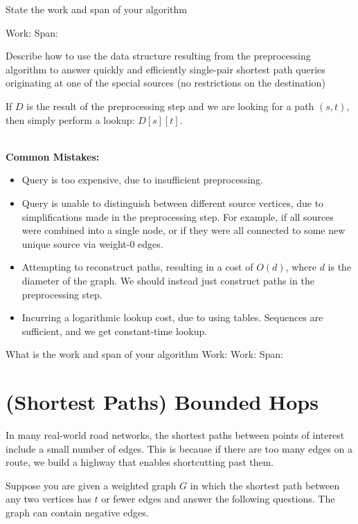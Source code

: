 \begin{problem}
\ask[4]
State the work and span of your algorithm

\sols 
Work: 
Span: 

\ask[5]
Describe how to use the data structure resulting from the
preprocessing algorithm to answer quickly and efficiently single-pair
shortest path queries originating at one of the special sources (no
restrictions on the destination)

\sol
If $D$ is the result of the preprocessing step and we are looking for a path
$(s, t)$, then simply perform a lookup: $D[s][t]$.
~~~~~~~~~~~~~~~~~~~~~~~~~~~~~~~~~~~~~~~~~~~~~~~~~

\notes
\textbf{Common Mistakes:}
\begin{itemize}
	\item Query is too expensive, due to insufficient preprocessing.
	\item Query is unable to distinguish between different source vertices, due
  to simplifications made in the preprocessing step. For example, if all
  sources were combined into a single node, or if they were all connected to
  some new unique source via weight-0 edges.
	\item Attempting to reconstruct paths, resulting in a cost of $O(d)$, where
  $d$ is the diameter of the graph. We should instead just construct paths in
  the preprocessing step.
	\item Incurring a logarithmic lookup cost, due to using tables. Sequences are
  sufficient, and we get constant-time lookup.
\end{itemize}


\ask What is the work and span of your algorithm Work: 
\sols 
Work:   
Span:  


\end{problem}





\section{(Shortest Paths) Bounded Hops}

In many real-world road networks, the shortest paths between points of
interest include a small number of edges.  This is because if there
are too many edges on a route, we build a highway that enables
shortcutting past them.  

Suppose you are given a weighted graph $G$ in which the shortest path
between any two vertices has $t$ or fewer edges and answer the
following questions.  The graph can contain negative edges.


